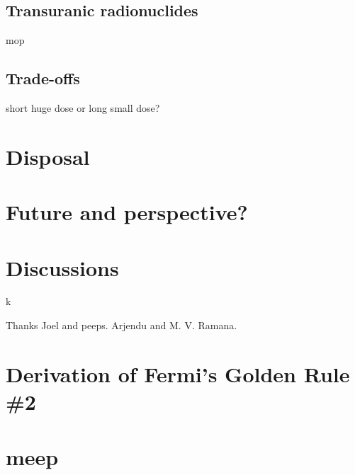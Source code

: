 \documentclass[preprint,aip,cha]{revtex4-1}
\begin{document}
    \subsection{Transuranic radionuclides}
    mop
    \subsection{Trade-offs}
    short huge dose or long small dose?

\section{Disposal}

\section{Future and perspective?}

\section{Discussions}

k
\begin{acknowledgments}
Thanks Joel and peeps. Arjendu and M. V. Ramana.
\end{acknowledgments}

\pagebreak


\appendix
\section{Derivation of Fermi's Golden Rule \#2}
\label{a:fermi}
\section{meep}
\end{document}
